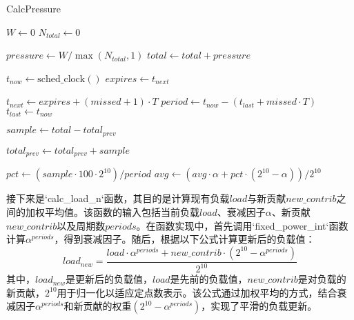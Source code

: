 \begin{algorithm}[h]
    \caption{CalcPressure}
    \label{alg:calc_pressure}

    \(W \gets 0\)\;
    \(N_{total} \gets 0\)\;


    \(pressure \gets W / \max(N_{total}, 1)\)\;
    \(total \gets total + pressure\)\;

    \(t_{now} \gets \mathrm{sched\_clock}()\)\;  
    \(expires \gets t_{next}\)\;



    \(t_{next} \gets expires + (missed + 1) \cdot T\)\;
    \(period \gets t_{now} - (t_{last} + missed \cdot T)\)\;
    \(t_{last} \gets t_{now}\)\;

    \(sample \gets total - total_{prev}\)\;

    \(total_{prev} \gets total_{prev} + sample\)\;


    \(pct \gets (sample \cdot 100 \cdot 2^{10}) / period\)\;
    \(avg \gets (avg \cdot \alpha + pct \cdot (2^{10} - \alpha)) / 2^{10}\)\;
\end{algorithm}
接下来是`calc\_load\_n`函数，其目的是计算现有负载\(load\)与新贡献\(new\_contrib\)之间的加权平均值。该函数的输入包括当前负载\(load\)、衰减因子\(\alpha\)、新贡献\(new\_contrib\)以及周期数\(periods\)。在函数实现中，首先调用`fixed\_power\_int`函数计算\(\alpha^{periods}\)，得到衰减因子。随后，根据以下公式计算更新后的负载值：
\[
load_{new} = \frac{load \cdot \alpha^{periods} + new\_contrib \cdot (2^{10} - \alpha^{periods})}{2^{10}}
\]
其中，\(load_{new}\)是更新后的负载值，\(load\)是先前的负载值，\(new\_contrib\)是对负载的新贡献，\(2^{10}\)用于归一化以适应定点数表示。该公式通过加权平均的方式，结合衰减因子\(\alpha^{periods}\)和新贡献的权重\((2^{10} - \alpha^{periods})\)，实现了平滑的负载更新。

